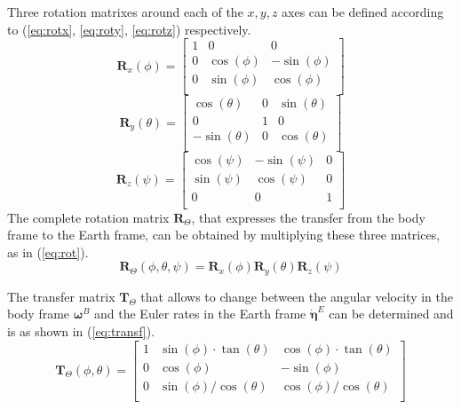 \documentclass[journal]{IEEEtran}
\begin{document}
	Three rotation matrixes around each of the $x, y, z$ axes can be defined according to (\ref{eq:rotx}, \ref{eq:roty}, \ref{eq:rotz}) respectively.
	\begin{equation} \label{eq:rotx}
	\bm{R}_x (\phi)=
	\left[ {\begin{array}{ccc}
		1 & 0 & 0 \\
		0 & \cos(\phi) & -\sin(\phi) \\
		0 &  \sin(\phi) & \cos(\phi) \\ 
		\end{array} } \right]
	\end{equation}  
	\begin{equation} \label{eq:roty}
	\bm{R}_y (\theta)=
	\left[ {\begin{array}{ccc}
		\cos(\theta) & 0 & \sin(\theta) \\
		0 & 1 & 0 \\
		-\sin(\theta) &  0 & \cos(\theta) \\ 
		\end{array} } \right]
	\end{equation}  
	\begin{equation} \label{eq:rotz}
	\bm{R}_z (\psi)=
	\left[ {\begin{array}{ccc}
		\cos(\psi) & -\sin(\psi) & 0 \\
		\sin(\psi) & \cos(\psi) & 0 \\
		0 &  0 & 1 \\ 
		\end{array} } \right]
	\end{equation}  
	The complete rotation matrix $\bm{R}_\Theta$, that expresses the transfer from the body frame to the Earth frame, can be obtained by multiplying these three matrices, as in (\ref{eq:rot}).
	\begin{equation} \label{eq:rot}
	\bm{R}_\Theta (\phi, \theta, \psi) = 	\bm{R}_x (\phi)  \bm{R}_y (\theta)  \bm{R}_z (\psi)
	\end{equation}  
	
	The transfer matrix $\bm{T}_\Theta$ that allows to change between the angular velocity in the body frame $\bm{\omega}^B$ and the Euler rates in the Earth frame $\bm{\dot \eta}^E$  can be determined and is as shown in (\ref{eq:transf}).
	\begin{equation} \label{eq:transf}
	\bm{T}_\Theta (\phi,\theta )= \left[ {\begin{array}{ccc}
		1 & \sin(\phi) \cdot \tan(\theta) & \cos(\phi) \cdot \tan (\theta) \\
		0 & \cos(\phi) & -\sin(\phi) \\
		0 &  \sin(\phi)/\cos(\theta) & \cos(\phi)/\cos(\theta)  \\ 
		\end{array} } \right]
	\end{equation}  
	
\end{document}
